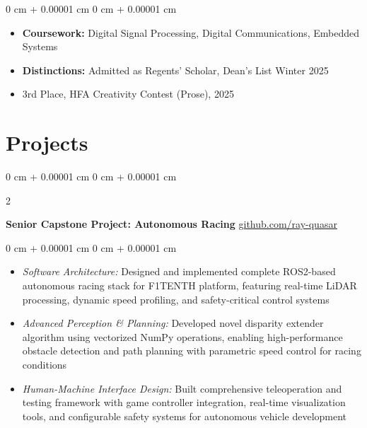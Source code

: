 \documentclass[10pt, letterpaper]{article}
\newenvironment{highlights}{
    \begin{itemize}[
        topsep=0.10 cm,
        parsep=0.10 cm,
        partopsep=0pt,
        itemsep=0pt,
        leftmargin=0 cm + 10pt
    ]
}{
    \end{itemize}
} %
\newenvironment{onecolentry}{
    \begin{adjustwidth}{
        0 cm + 0.00001 cm
    }{
        0 cm + 0.00001 cm
    }
}{
    \end{adjustwidth}
} %
\newenvironment{twocolentry}[2][]{
    \onecolentry
    \def\secondColumn{#2}
    \setcolumnwidth{\fill, 4.5 cm}
    \begin{paracol}{2}
}{
    \switchcolumn \raggedleft \secondColumn
    \end{paracol}
    \endonecolentry
} %
\begin{document}
        \vspace{0.10 cm}
        \begin{onecolentry}
            \begin{highlights}
                \item \textbf{Coursework:} Digital Signal Processing, Digital Communications, Embedded Systems
                \item \textbf{Distinctions:} Admitted as Regents' Scholar, Dean's List Winter 2025
                \item 3rd Place, HFA Creativity Contest (Prose), 2025
            \end{highlights}
        \end{onecolentry}

    \section{Projects}

        \begin{twocolentry}{
            \href{https://github.com/ray-quasar}{github.com/ray-quasar}
        }
            \textbf{Senior Capstone Project: Autonomous Racing}\end{twocolentry}

        \vspace{0.10 cm}
        \begin{onecolentry}
            \begin{highlights}
                \item \textit{Software Architecture:} Designed and implemented complete ROS2-based autonomous racing stack for F1TENTH platform, featuring real-time LiDAR processing, dynamic speed profiling, and safety-critical control systems
                \item \textit{Advanced Perception \& Planning:} Developed novel disparity extender algorithm using vectorized NumPy operations, enabling high-performance obstacle detection and path planning with parametric speed control for racing conditions
                \item \textit{Human-Machine Interface Design:} Built comprehensive teleoperation and testing framework with game controller integration, real-time visualization tools, and configurable safety systems for autonomous vehicle development
            \end{highlights}
        \end{onecolentry}
\end{document}
